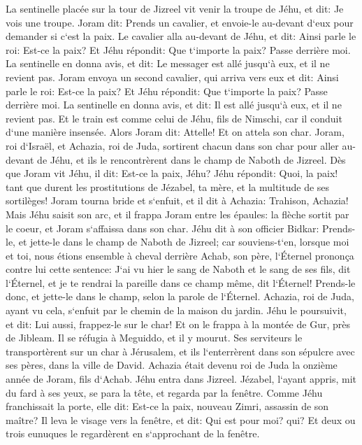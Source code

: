 \verse La sentinelle placée sur la tour de Jizreel vit venir la troupe de Jéhu, et dit: Je vois une troupe. Joram dit: Prends un cavalier, et envoie-le au-devant d`eux pour demander si c`est la paix. 
\verse Le cavalier alla au-devant de Jéhu, et dit: Ainsi parle le roi: Est-ce la paix? Et Jéhu répondit: Que t`importe la paix? Passe derrière moi. La sentinelle en donna avis, et dit: Le messager est allé jusqu`à eux, et il ne revient pas. 
\verse Joram envoya un second cavalier, qui arriva vers eux et dit: Ainsi parle le roi: Est-ce la paix? Et Jéhu répondit: Que t`importe la paix? Passe derrière moi. 
\verse La sentinelle en donna avis, et dit: Il est allé jusqu`à eux, et il ne revient pas. Et le train est comme celui de Jéhu, fils de Nimschi, car il conduit d`une manière insensée. 
\verse Alors Joram dit: Attelle! Et on attela son char. Joram, roi d`Israël, et Achazia, roi de Juda, sortirent chacun dans son char pour aller au-devant de Jéhu, et ils le rencontrèrent dans le champ de Naboth de Jizreel. 
\verse Dès que Joram vit Jéhu, il dit: Est-ce la paix, Jéhu? Jéhu répondit: Quoi, la paix! tant que durent les prostitutions de Jézabel, ta mère, et la multitude de ses sortilèges! 
\verse Joram tourna bride et s`enfuit, et il dit à Achazia: Trahison, Achazia! 
\verse Mais Jéhu saisit son arc, et il frappa Joram entre les épaules: la flèche sortit par le coeur, et Joram s`affaissa dans son char. 
\verse Jéhu dit à son officier Bidkar: Prends-le, et jette-le dans le champ de Naboth de Jizreel; car souviens-t`en, lorsque moi et toi, nous étions ensemble à cheval derrière Achab, son père, l`Éternel prononça contre lui cette sentence: 
\verse J`ai vu hier le sang de Naboth et le sang de ses fils, dit l`Éternel, et je te rendrai la pareille dans ce champ même, dit l`Éternel! Prends-le donc, et jette-le dans le champ, selon la parole de l`Éternel. 
\verse Achazia, roi de Juda, ayant vu cela, s`enfuit par le chemin de la maison du jardin. Jéhu le poursuivit, et dit: Lui aussi, frappez-le sur le char! Et on le frappa à la montée de Gur, près de Jibleam. Il se réfugia à Meguiddo, et il y mourut. 
\verse Ses serviteurs le transportèrent sur un char à Jérusalem, et ils l`enterrèrent dans son sépulcre avec ses pères, dans la ville de David. 
\verse Achazia était devenu roi de Juda la onzième année de Joram, fils d`Achab. 
\verse Jéhu entra dans Jizreel. Jézabel, l`ayant appris, mit du fard à ses yeux, se para la tête, et regarda par la fenêtre. 
\verse Comme Jéhu franchissait la porte, elle dit: Est-ce la paix, nouveau Zimri, assassin de son maître? 
\verse Il leva le visage vers la fenêtre, et dit: Qui est pour moi? qui? Et deux ou trois eunuques le regardèrent en s`approchant de la fenêtre. 
